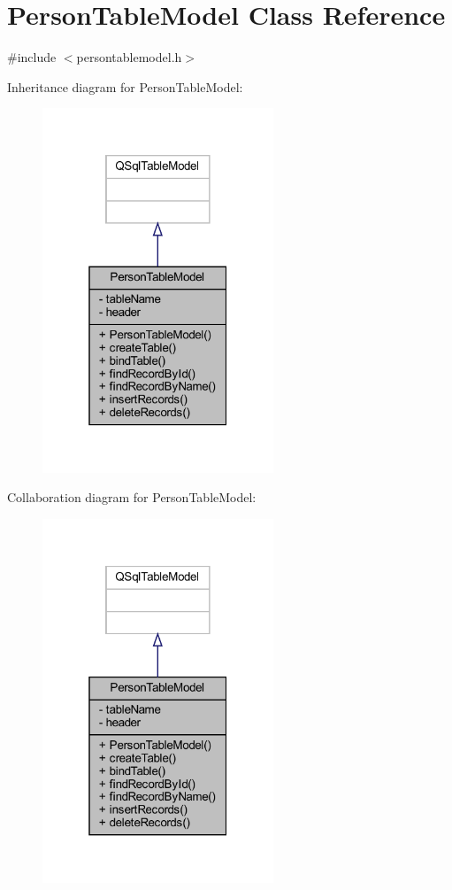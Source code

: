 \hypertarget{class_person_table_model}{}\section{Person\+Table\+Model Class Reference}
\label{class_person_table_model}


{\ttfamily \#include $<$persontablemodel.\+h$>$}



Inheritance diagram for Person\+Table\+Model\+:
\nopagebreak
\begin{figure}[H]
\begin{center}
\leavevmode
\includegraphics[width=196pt]{class_person_table_model__inherit__graph}
\end{center}
\end{figure}


Collaboration diagram for Person\+Table\+Model\+:
\nopagebreak
\begin{figure}[H]
\begin{center}
\leavevmode
\includegraphics[width=196pt]{class_person_table_model__coll__graph}
\end{center}
\end{figure}
